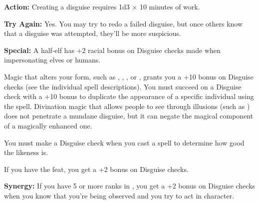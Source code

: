 \textbf{Action:} Creating a disguise requires 1d3 $\times$ 10 minutes of work.

\textbf{Try Again:} Yes. You may try to redo a failed disguise, but once others know that a disguise was attempted, they'll be more suspicious.

\textbf{Special:} A half-elf has +2 racial bonus on Disguise checks made when impersonating elves or humans.

Magic that alters your form, such as , , , or , grants you a +10 bonus on Disguise checks (see the individual spell descriptions). You must succeed on a Disguise check with a +10 bonus to duplicate the appearance of a specific individual using the  spell. Divination magic that allows people to see through illusions (such as ) does not penetrate a mundane disguise, but it can negate the magical component of a magically enhanced one.

You must make a Disguise check when you cast a  spell to determine how good the likeness is.

If you have the  feat, you get a +2 bonus on Disguise checks.

\textbf{Synergy:} If you have 5 or more ranks in , you get a +2 bonus on Disguise checks when you know that you're being observed and you try to act in character.